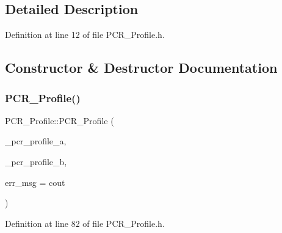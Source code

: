 \subsection{Detailed Description}


Definition at line 12 of file P\+C\+R\+\_\+\+Profile.\+h.



\subsection{Constructor \& Destructor Documentation}
\mbox{\label{class_p_c_r___profile_a3b52a78e4b4db8f2c571aaf66bf9a2cc}} 
\subsubsection{\texorpdfstring{P\+C\+R\+\_\+\+Profile()}{PCR\_Profile()}\hspace{0.1cm}{\footnotesize\ttfamily [1/3]}}
{\footnotesize\ttfamily P\+C\+R\+\_\+\+Profile\+::\+P\+C\+R\+\_\+\+Profile (\begin{DoxyParamCaption}\item[{\mbox{\hyperlink{class_p_c_r___profile}{P\+C\+R\+\_\+\+Profile}} $\ast$}]{\+\_\+pcr\+\_\+profile\+\_\+a,  }\item[{\mbox{\hyperlink{class_p_c_r___profile}{P\+C\+R\+\_\+\+Profile}} $\ast$}]{\+\_\+pcr\+\_\+profile\+\_\+b,  }\item[{ostream \&}]{err\+\_\+msg = {\ttfamily cout} }\end{DoxyParamCaption})}



Definition at line 82 of file P\+C\+R\+\_\+\+Profile.\+h.

